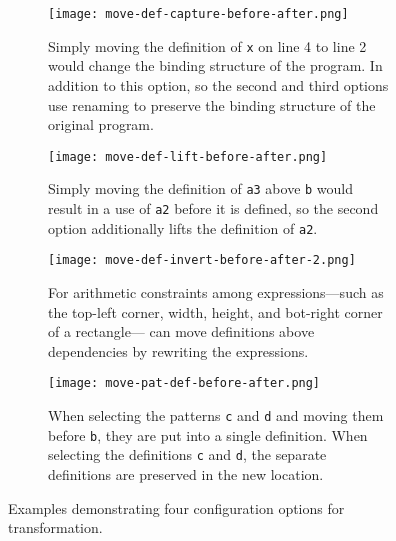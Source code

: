 \begin{figure*}[t]

\newcommand{\scaleABD}{0.29}
\newcommand{\scaleC}{0.41}
\newcommand{\vsepFigure}{\vspace{0.08in}}

\begin{subfigure}{\textwidth}
  \centering
  \texttt{[image: move-def-capture-before-after.png]}
  \caption{Simply moving the definition of \texttt{x} on line 4 to line 2 would
change the binding structure of the program. In addition to this
option, so the second and third options use renaming to
preserve the binding structure of the original program.}
  \label{fig:move-def-a}
\end{subfigure}

\vsepFigure

\begin{subfigure}{\textwidth}
  \centering
  \texttt{[image: move-def-lift-before-after.png]}
  \caption{Simply moving the definition of \texttt{a3} above \texttt{b} would
result in a use of \texttt{a2} before it is defined, so the second
option additionally lifts the definition of \texttt{a2}.}
  \label{fig:move-def-b}
\end{subfigure}

\vsepFigure

\begin{subfigure}{\textwidth}
  \centering
  \texttt{[image: move-def-invert-before-after-2.png]}
  \caption{For arithmetic constraints among expressions---such as the
top-left corner, width, height, and bot-right corner of a rectangle---
 can move definitions above dependencies by rewriting
the expressions.}
  \label{fig:move-def-c}
\end{subfigure}

\vsepFigure

\begin{subfigure}{\textwidth}
  \centering
  \texttt{[image: move-pat-def-before-after.png]}
  \caption{When selecting the patterns \texttt{c} and \texttt{d} and
moving them before \texttt{b}, they are put into a single definition.
When selecting the definitions \texttt{c} and \texttt{d}, the separate
definitions are preserved in the new location.}
  \label{fig:move-def-d}
\end{subfigure}

\caption{Examples demonstrating four configuration options for
 transformation.}
\label{fig:move-def}
\end{figure*}
